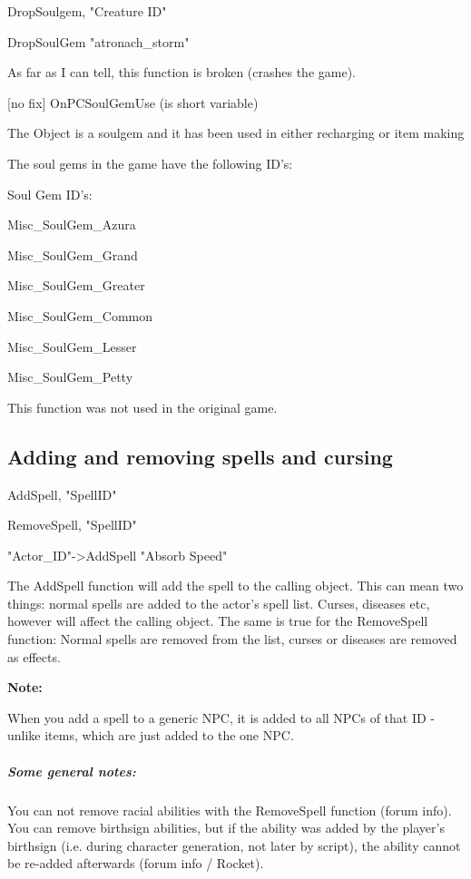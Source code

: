 \documentclass[
]{article}
\begin{document}
DropSoulgem, "Creature ID"

DropSoulGem "atronach\_storm"

As far as I can tell, this function is broken (crashes the game).

{[}no fix{]} OnPCSoulGemUse (is short variable)

The Object is a soulgem and it has been used in either recharging or
item making

The soul gems in the game have the following ID's:

Soul Gem ID's:

Misc\_SoulGem\_Azura

Misc\_SoulGem\_Grand

Misc\_SoulGem\_Greater

Misc\_SoulGem\_Common

Misc\_SoulGem\_Lesser

Misc\_SoulGem\_Petty

This function was not used in the original game.

\hypertarget{adding-and-removing-spells-and-cursing}{%
\subsection{\texorpdfstring{\hfill\break
Adding and removing spells and cursing
}{ Adding and removing spells and cursing }}\label{adding-and-removing-spells-and-cursing}}

AddSpell, "SpellID"

RemoveSpell, "SpellID"

"Actor\_ID"-\textgreater AddSpell "Absorb Speed"

The AddSpell function will add the spell to the calling object. This can
mean two things: normal spells are added to the actor's spell list.
Curses, diseases etc, however will affect the calling object. The same
is true for the RemoveSpell function: Normal spells are removed from the
list, curses or diseases are removed as effects.

\textbf{Note:}

When you add a spell to a generic NPC, it is added to all NPCs of that
ID - unlike items, which are just added to the one NPC.

\hypertarget{some-general-notes}{%
\subparagraph{Some general notes:}\label{some-general-notes}}

You can not remove racial abilities with the RemoveSpell function (forum
info). You can remove birthsign abilities, but if the ability was added
by the player's birthsign (i.e. during character generation, not later
by script), the ability cannot be re-added afterwards (forum info /
Rocket).
\end{document}
